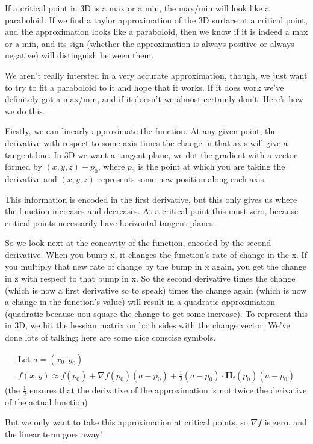 \documentclass[12pt, letterpaper]{article}
\begin{document}
If a critical point in 3D is a max or a min, the max/min will look like a paraboloid. If we find a taylor approximation of the 3D surface at a critical point, and the approximation looks like a paraboloid, then we know if it is indeed a max or a min, and its sign (whether the approximation is always positive or always negative) will distinguish between them.

We aren't really intersted in a very accurate approximation, though, we just want to try to fit a paraboloid to it and hope that it works. If it does work we've definitely got a max/min, and if it doesn't we almost certainly don't. Here's how we do this.

Firstly, we can linearly approximate the function. At any given point, the derivative with respect to some axis times the change in that axis will give a tangent line. In 3D we want a tangent plane, we dot the gradient with a vector formed by $(x, y, z) - p_0$, where $p_0$ is the point at which you are taking the derivative and $(x, y, z)$ represents some new position along each axis

This information is encoded in the first derivative, but this only gives us where the function increases and decreases. At a critical point this must zero, because critical points necessarily have horizontal tangent planes.

So we look next at the concavity of the function, encoded by the second derivative. When you bump x, it changes the function's rate of change in the x. 
If you multiply that new rate of change by the bump in x again, you get the change in z with respect to that bump in x. So the second derivative times the change (which is now a first derivative so to speak) times the change again (which is now a change in the function's value) will result in a quadratic approximation (quadratic because uou square the change to get some increase). 
To represent this in 3D, we hit the hessian matrix on both sides with the change vector. We've done lots of talking; here are some nice conscise symbols.

\begin{gather*}
    \text{Let } a = (x_0, y_0)\\
    f(x, y) \approx f(p_0) + \nabla f(p_0)(a - p_0) + \frac{1}{2}(a - p_0) \cdot \mathbf{H_f}(p_0)(a - p_0)
\end{gather*}
(the $\frac{1}{2}$ ensures that the derivative of the approximation is not twice the derivative of the actual function)

But we only want to take this approximation at critical points, so $\nabla f$ is zero, and the linear term goes away!
\end{document}
